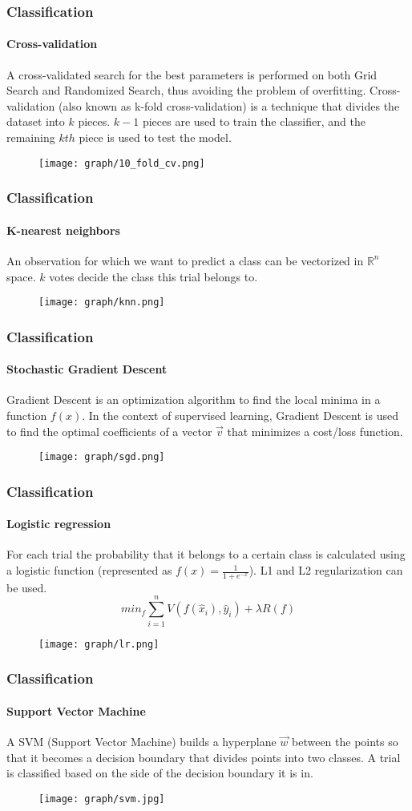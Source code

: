 \documentclass{beamer}
\begin{document}
	\begin{frame}
		\frametitle{Classification}
		\framesubtitle{Cross-validation}
			A cross-validated search for the best parameters is performed on both Grid Search and Randomized Search, thus avoiding the problem of overfitting. Cross-validation (also known as k-fold cross-validation) is a technique that divides the dataset into $k$ pieces. $k - 1$ pieces are used to train the classifier, and the remaining $kth$ piece is used to test the model.
			\begin{figure}
				\centering
				\texttt{[image: graph/10\_fold\_cv.png]}
			\end{figure}

	\end{frame}
	\begin{frame}
		\frametitle{Classification}
		\framesubtitle{K-nearest neighbors}
		An observation for which we want to predict a class can be vectorized in $\mathbb{R}^{n}$ space. $k$ votes decide the class this trial belongs to.
		\begin{figure}
			\centering
			\texttt{[image: graph/knn.png]}
		\end{figure}
	\end{frame}
	\begin{frame}
		\frametitle{Classification}
		\framesubtitle{Stochastic Gradient Descent}
		Gradient Descent is an optimization algorithm to find the local minima in a function $f(x)$. In the context of supervised learning, Gradient Descent is used to find the optimal coefficients of a vector $\vec{v}$ that minimizes a cost/loss function.
		\begin{figure}
			\centering
			\texttt{[image: graph/sgd.png]}
		\end{figure}
	\end{frame}
	\begin{frame}
		\frametitle{Classification}
		\framesubtitle{Logistic regression}
		For each trial the probability that it belongs to a certain class is calculated using a logistic function (represented as {$f(x)=\frac{1}{1+e^{-x}}$}). L1 and L2 regularization can be used.
		$$min_f \sum_{i=1}^{n} V(f(\hat x_i), \hat y_i) + \lambda R(f)$$
		\begin{figure}
			\centering
			\texttt{[image: graph/lr.png]}
		\end{figure}
	\end{frame}
	\begin{frame}
		\frametitle{Classification}
		\framesubtitle{Support Vector Machine}
		A SVM (Support Vector Machine) builds a hyperplane $\vec{w}$ between the points so that it becomes a decision boundary that divides points into two classes. A trial is classified based on the side of the decision boundary it is in.
		\begin{figure}
			\centering
			\texttt{[image: graph/svm.jpg]}
		\end{figure}
	\end{frame}
\end{document}
